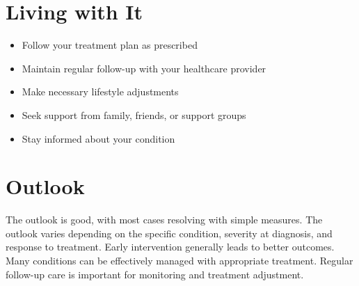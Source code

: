\section{Living with It}
\begin{itemize}[noitemsep]
  \item Follow your treatment plan as prescribed
  \item Maintain regular follow-up with your healthcare provider
  \item Make necessary lifestyle adjustments
  \item Seek support from family, friends, or support groups
  \item Stay informed about your condition
\end{itemize}
\section{Outlook}
The outlook is good, with most cases resolving with simple measures. The outlook varies depending on the specific condition, severity at diagnosis, and response to treatment. Early intervention generally leads to better outcomes. Many conditions can be effectively managed with appropriate treatment. Regular follow-up care is important for monitoring and treatment adjustment.
